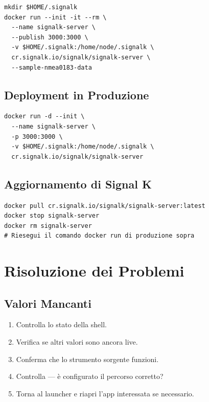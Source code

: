 \begin{lstlisting}
mkdir $HOME/.signalk
docker run --init -it --rm \
  --name signalk-server \
  --publish 3000:3000 \
  -v $HOME/.signalk:/home/node/.signalk \
  cr.signalk.io/signalk/signalk-server \
  --sample-nmea0183-data
\end{lstlisting}

\section{Deployment in Produzione}

\begin{lstlisting}
docker run -d --init \
  --name signalk-server \
  -p 3000:3000 \
  -v $HOME/.signalk:/home/node/.signalk \
  cr.signalk.io/signalk/signalk-server
\end{lstlisting}

\section{Aggiornamento di Signal K}

\begin{lstlisting}
docker pull cr.signalk.io/signalk/signalk-server:latest
docker stop signalk-server
docker rm signalk-server
# Riesegui il comando docker run di produzione sopra
\end{lstlisting}

\chapter{Risoluzione dei Problemi}
\label{ch:problemi}

\section{Valori Mancanti}

\begin{enumerate}
  \item Controlla lo stato della shell.
  \item Verifica se altri valori sono ancora live.
  \item Conferma che lo strumento sorgente funzioni.
  \item Controlla  --- è configurato il percorso corretto?
  \item Torna al launcher e riapri l'app interessata se necessario.
\end{enumerate}

